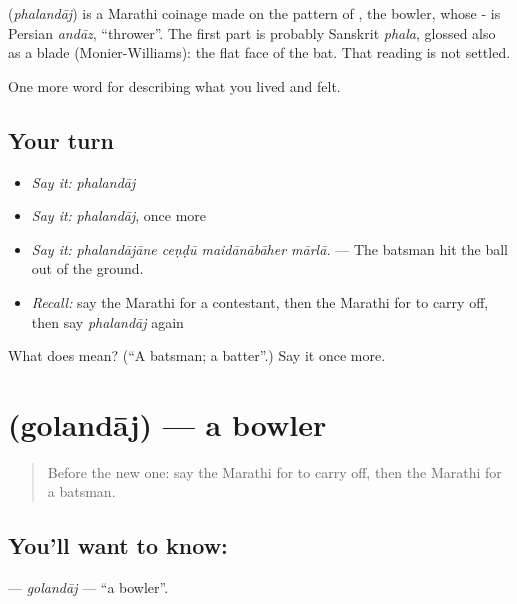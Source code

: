 \begin{cousinweb}
\textbf{} (\emph{phalandāj}) is a Marathi coinage made on the pattern of , the bowler, whose - is Persian \emph{andāz}, \textquotedblleft{}thrower\textquotedblright{}. The first part is probably Sanskrit \emph{phala}, glossed also as a blade (Monier-Williams): the flat face of the bat. That reading is not settled.
\end{cousinweb}

\begin{grammarlens}[title={What you've built}]
One more word for describing what you lived and felt.
\end{grammarlens}

\subsection*{Your turn}
\begin{itemize}
\raggedright
  \item \emph{Say it:} \emph{phalandāj}
  \item \emph{Say it:} \emph{phalandāj}, once more
  \item \emph{Say it:} \emph{phalandājāne ceṇḍū maidānābāher mārlā.} — The batsman hit the ball out of the ground.
  \item \emph{Recall:} say the Marathi for a contestant, then the Marathi for to carry off, then say \emph{phalandāj} again
\end{itemize}

\begin{tcolorbox}[breakable,colback=teal!4,colframe=teal!35!black,title={Before you move on}]
What does  mean? (\textquotedblleft{}A batsman; a batter\textquotedblright{}.) Say it once more.
\end{tcolorbox}
\section[\texorpdfstring{\mr{गोलंदाज} (golandāj)}{गोलंदाज (golandāj)}]{ (golandāj) — a bowler}

\label{lesson:MR-C531-golandaj}



\begin{quote}
Before the new one: say the Marathi for to carry off, then the Marathi for a batsman.
\end{quote}

\subsection*{You'll want to know: }
\textbf{} — \emph{golandāj} — \textquotedblleft{}a bowler\textquotedblright{}.

